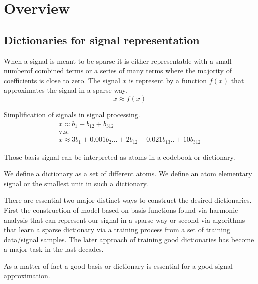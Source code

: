 \chapter{Overview}

\section{Dictionaries for signal representation}

When a signal is meant to be sparse it is either representable with a small
numberof combined terms or a series of many terms where the majority of
coefficients is close to zero. The signal $x$ is represent by a function $f(x)$
that approximates the signal in a sparse way.
\begin{equation*}
x \approx f\left(x\right)
\end{equation*}

Simplification of signals in signal processing.
\begin{gather*}
x \approx b_{1} + b_{12} + b_{312}\\
 \text{v.s.}\\ x \approx 3b_{1} + 0.001b_{2} ... + 2b_{12} + 0.021b_{13} .. + 10b_{312}
\end{gather*}



Those basis signal can be interpreted as atoms in a codebook or dictionary.

We define a dictionary as a set of different atoms. We define an atom
elementary signal or the smallest unit in such a dictionary.

There are essential two major distinct ways to construct the 
desired dictionaries. First the construction of model based on basis functions
found via harmonic analysis that can represent our signal in a sparse way or
second via algorithms that learn a sparse dictionary via a training process from
a set of training data/signal samples. The later approach of training good
dictionaries has become a major task in the last decades\cite{Mairal2010}.

As a matter of fact a good basis or dictionary is essential for a good
signal approximation\cite{}.



